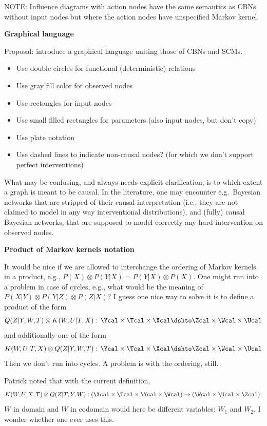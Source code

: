 NOTE: Influence diagrams with action nodes have the same semantics
as CBNs without input nodes but where the action nodes have 
unspecified Markov kernel.

\textbf{Graphical language}

Proposal: introduce a graphical language uniting those of CBNs and SCMs.
\begin{itemize}
  \item Use double-circles for functional (deterministic) relations
  \item Use gray fill color for observed nodes
  \item Use rectangles for input nodes
  \item Use small filled rectangles for parameters (also input nodes, but don't copy)
  \item Use plate notation
  \item Use dashed lines to indicate non-causal nodes? (for which we don't support perfect interventions)
\end{itemize}
What may be confusing, and always needs explicit clarification, is to which extent
a graph is meant to be causal. In the literature, one may encounter e.g.\ Bayesian
networks that are stripped of their causal interpretation (i.e., they are not claimed
to model in any way interventional distributions), and (fully) causal Bayesian networks,
that are supposed to model correctly any hard intervention on observed nodes.

\textbf{Product of Markov kernels notation}

It would be nice if we are allowed to interchange the ordering of Markov kernels in a product, e.g.,
$P(X) \otimes P(Y|X) = P(Y|X) \otimes P(X)$.
One might run into a problem in case of cycles, e.g., what would be the meaning of $P(X|Y) \otimes P(Y|Z) \otimes P(Z|X)$?
I guess one nice way to solve it is to define a product of the form
$$Q(Z|Y,W,T) \otimes K(W,U|T,X) :\, \Ycal \times \Tcal \times \Xcal \dshto \Zcal \times \Wcal \times \Ucal$$
and additionally one of the form
$$K(W,U|T,X) \otimes Q(Z|Y,W,T) :\, \Ycal \times \Tcal \times \Xcal \dshto \Zcal \times \Wcal \times \Ucal$$
Then we don't run into cycles. A problem is with the ordering, still.

Patrick noted that with the current definition,
$$K(W,U|X,T) \otimes Q(Z|T,Y,W): (\Xcal \times \Tcal \times \Ycal \times \Wcal) \to (\Wcal \times \Ucal \times \Zcal),$$
$W$ in domain and $W$ in codomain would here be different variables: $W_1$ and $W_2$.
I wonder whether one ever uses this. 

